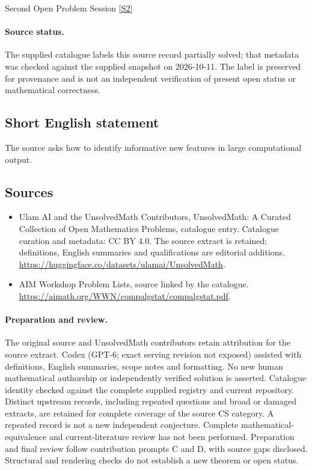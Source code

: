 \documentclass[11pt]{article}
\newcommand{\sref}[2]{\hyperlink{source:#1:#2}{[S#2]}}
\begin{document}
Second Open Problem Session \sref{statement}{2}
\paragraph{Source status.}
The supplied catalogue labels this source record partially solved; that metadata was checked against the supplied snapshot on 2026-10-11. The label is preserved for provenance and is not an independent verification of present open status or mathematical correctness.
\subsection{Short English statement}
The source asks how to identify informative new features in large computational output.
\subsection{Sources}
\begin{itemize}
\item[\hypertarget{source:statement:1}{S1}] Ulam AI and the UnsolvedMath Contributors, UnsolvedMath: A Curated Collection of Open Mathematics Problems, catalogue entry. Catalogue curation and metadata: CC BY 4.0. The source extract is retained; definitions, English summaries and qualifications are editorial additions.
\url{https://huggingface.co/datasets/ulamai/UnsolvedMath}.
\item[\hypertarget{source:statement:2}{S2}] AIM Workshop Problem Lists, source linked by the catalogue.
\url{https://aimath.org/WWN/compalgstat/compalgstat.pdf}.
\end{itemize}
\paragraph{Preparation and review.}
The original source and UnsolvedMath contributors retain attribution for the source extract. Codex (GPT-6; exact serving revision not exposed) assisted with definitions, English summaries, scope notes and formatting. No new human mathematical authorship or independently verified solution is asserted. Catalogue identity checked against the complete supplied registry and current repository. Distinct upstream records, including repeated questions and broad or damaged extracts, are retained for complete coverage of the source CS category. A repeated record is not a new independent conjecture. Complete mathematical-equivalence and current-literature review has not been performed. Preparation and final review follow contribution prompts C and D, with source gaps disclosed. Structural and rendering checks do not establish a new theorem or open status.
\label{end:statement}
\end{document}
